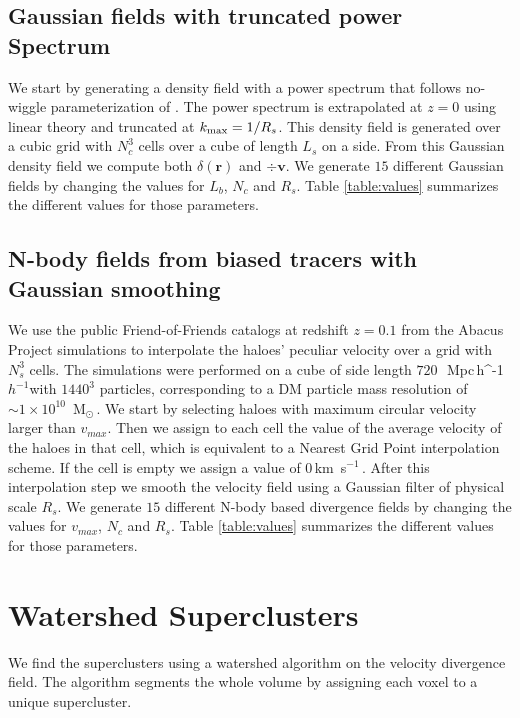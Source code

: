 \documentclass[usenatbib]{mnras}
\newcommand{\Msun}{\,{\rm M}$_{\odot}$\,}
\newcommand{\Mpch}{\,{\rm Mpc}\,\ifmmode h^{-1}\else $h^{-1}$\fi}
\newcommand{\kms}{\,{\rm km}\ s$^{-1}$\,}
\begin{document}
\subsection{Gaussian fields with truncated power Spectrum}

We start by generating a density field with a power spectrum that follows no-wiggle parameterization of \cite{1998ApJ...496..605E}.
The power spectrum is extrapolated at $z=0$ using linear theory and truncated at $k_{\rm max}=1/R_s$.
This density field is generated over a cubic grid with $N_c^3$ cells over a cube of length $L_s$ on a side.
From this Gaussian density field we compute both $\delta(\textbf{r})$ and $\div \textbf{v}$.
We generate $15$ different Gaussian fields by changing the values for $L_b$, $N_c$ and $R_s$. 
Table \ref{table:values} summarizes the different values for those parameters.

\subsection{N-body fields from biased tracers with Gaussian smoothing}

We use the public Friend-of-Friends catalogs at redshift $z=0.1$
from the Abacus Project simulations to interpolate the haloes' peculiar velocity over a grid with $N_s^3$ cells.
The simulations were performed on a cube of side length $720$\ \Mpch with
$1440^3$ particles, corresponding to a DM particle mass resolution of $\sim 1 \times 10^{10}$ \Msun.
We start by selecting haloes with maximum circular velocity larger
than $v_{max}$.
Then we assign to each cell the value of the average velocity of the haloes in that cell, which is equivalent to a Nearest Grid Point interpolation scheme. 
If the cell is empty we assign a value of $0$\kms.
After this interpolation step we smooth the velocity field using a Gaussian filter of physical scale $R_s$.
We generate $15$ different N-body based divergence fields by changing the values for $v_{max}$, $N_c$ and $R_s$. 
Table \ref{table:values} summarizes the different values for those parameters.


\section{Watershed Superclusters}

We find the superclusters using a watershed algorithm \citep{BeucherWatershed1979} on the velocity divergence field.
The algorithm segments the whole volume by assigning each voxel to a unique supercluster. 
\end{document}
